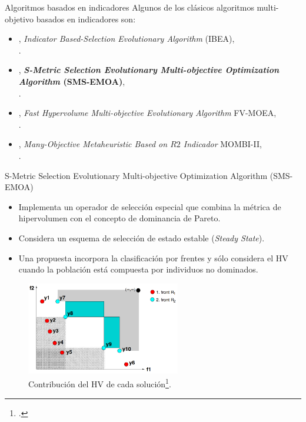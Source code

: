 \documentclass{beamer}
\begin{document}
\begin{frame}{Algoritmos basados en indicadores}
Algunos de los clásicos algoritmos multi-objetivo basados en indicadores son:
\begin{itemize}
\scriptsize
   \item \citeyear{Joel:IBEA}, \textit{Indicator Based-Selection Evolutionary Algorithm } (IBEA), \\ \citeauthor{Joel:IBEA}.
   \item \citeyear{Joel:SMSEMOA}, \textbf{\textit{S-Metric Selection Evolutionary Multi-objective Optimization Algorithm} (SMS-EMOA)}, \\ \citeauthor{Joel:SMSEMOA}.
   \item \citeyear{Joel:FV-MOEA}, \textit{Fast Hypervolume Multi-objective Evolutionary Algorithm} FV-MOEA, \\ \citeauthor{Joel:FV-MOEA}.
   \item \citeyear{Joel:MOMBI-II}, \textit{Many-Objective Metaheuristic Based on $R2$ Indicador} MOMBI-II, \\ \citeauthor{Joel:MOMBI-II}.
\end{itemize}
\end{frame}



\begin{frame}{S-Metric Selection Evolutionary Multi-objective Optimization Algorithm (SMS-EMOA)}
\begin{itemize}
\scriptsize
\item Implementa un operador de selección especial que combina la métrica de hipervolumen con el concepto de dominancia de Pareto.
%
\item Considera un esquema de selección de estado estable (\textit{Steady State}).
\item Una propuesta incorpora la clasificación por frentes y sólo considera el HV cuando la población está compuesta por individuos no dominados.
\end{itemize}
\begin{figure}[H]
\centering
\includegraphics[width=0.6\textwidth]{sms_emoa.png}
\caption{\scriptsize Contribución del HV de cada solución\footcite{Joel:SMSEMOA}.}
\end{figure}
\end{frame}
\end{document}
